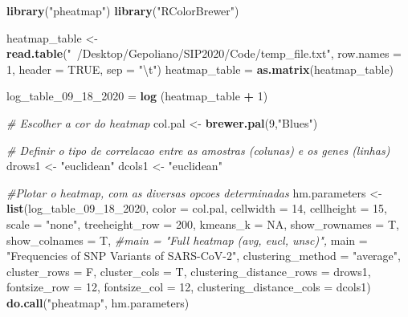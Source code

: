 \documentclass[
]{article}
\newenvironment{Shaded}{\begin{snugshade}}{\end{snugshade}}
\newcommand{\CharTok}[1]{\textcolor[rgb]{0.31,0.60,0.02}{#1}}
\newcommand{\CommentTok}[1]{\textcolor[rgb]{0.56,0.35,0.01}{\textit{#1}}}
\newcommand{\DataTypeTok}[1]{\textcolor[rgb]{0.13,0.29,0.53}{#1}}
\newcommand{\DecValTok}[1]{\textcolor[rgb]{0.00,0.00,0.81}{#1}}
\newcommand{\KeywordTok}[1]{\textcolor[rgb]{0.13,0.29,0.53}{\textbf{#1}}}
\newcommand{\NormalTok}[1]{#1}
\newcommand{\OperatorTok}[1]{\textcolor[rgb]{0.81,0.36,0.00}{\textbf{#1}}}
\newcommand{\OtherTok}[1]{\textcolor[rgb]{0.56,0.35,0.01}{#1}}
\newcommand{\StringTok}[1]{\textcolor[rgb]{0.31,0.60,0.02}{#1}}
\begin{document}
\begin{Shaded}
\begin{Highlighting}[]
\KeywordTok{library}\NormalTok{(}\StringTok{"pheatmap"}\NormalTok{)}
\KeywordTok{library}\NormalTok{(}\StringTok{"RColorBrewer"}\NormalTok{)}

\NormalTok{heatmap_table <-}\StringTok{ }\KeywordTok{read.table}\NormalTok{(}\StringTok{"~/Desktop/Gepoliano/SIP2020/Code/temp_file.txt"}\NormalTok{, }\DataTypeTok{row.names =} \DecValTok{1}\NormalTok{, }\DataTypeTok{header =} \OtherTok{TRUE}\NormalTok{, }\DataTypeTok{sep =} \StringTok{"}\CharTok{\textbackslash{}t}\StringTok{"}\NormalTok{)}
\NormalTok{heatmap_table =}\StringTok{ }\KeywordTok{as.matrix}\NormalTok{(heatmap_table)}

\NormalTok{log_table_}\DecValTok{09}\NormalTok{_}\DecValTok{18}\NormalTok{_}\DecValTok{2020}\NormalTok{ =}\StringTok{ }\KeywordTok{log}\NormalTok{ (heatmap_table }\OperatorTok{+}\StringTok{ }\DecValTok{1}\NormalTok{)}

\CommentTok{# Escolher a cor do heatmap}
\NormalTok{col.pal <-}\StringTok{ }\KeywordTok{brewer.pal}\NormalTok{(}\DecValTok{9}\NormalTok{,}\StringTok{"Blues"}\NormalTok{)}

\CommentTok{# Definir o tipo de correlacao entre as amostras (colunas) e os genes (linhas)}
\NormalTok{drows1 <-}\StringTok{ "euclidean"}
\NormalTok{dcols1 <-}\StringTok{ "euclidean"}

\CommentTok{#Plotar o heatmap, com as diversas opcoes determinadas}
\NormalTok{hm.parameters <-}\StringTok{ }\KeywordTok{list}\NormalTok{(log_table_}\DecValTok{09}\NormalTok{_}\DecValTok{18}\NormalTok{_}\DecValTok{2020}\NormalTok{, }
                      \DataTypeTok{color =}\NormalTok{ col.pal,}
                      \DataTypeTok{cellwidth =} \DecValTok{14}\NormalTok{, }\DataTypeTok{cellheight =} \DecValTok{15}\NormalTok{, }\DataTypeTok{scale =} \StringTok{"none"}\NormalTok{,}
                      \DataTypeTok{treeheight_row =} \DecValTok{200}\NormalTok{,}
                      \DataTypeTok{kmeans_k =} \OtherTok{NA}\NormalTok{,}
                      \DataTypeTok{show_rownames =}\NormalTok{ T, }\DataTypeTok{show_colnames =}\NormalTok{ T,}
                      \CommentTok{#main = "Full heatmap (avg, eucl, unsc)",}
                      \DataTypeTok{main =} \StringTok{"Frequencies of SNP Variants of SARS-CoV-2"}\NormalTok{,}
                      \DataTypeTok{clustering_method =} \StringTok{"average"}\NormalTok{,}
                      \DataTypeTok{cluster_rows =}\NormalTok{ F, }\DataTypeTok{cluster_cols =}\NormalTok{ T,}
                      \DataTypeTok{clustering_distance_rows =}\NormalTok{ drows1, }
                      \DataTypeTok{fontsize_row =} \DecValTok{12}\NormalTok{,}
                      \DataTypeTok{fontsize_col =} \DecValTok{12}\NormalTok{,}
                      \DataTypeTok{clustering_distance_cols =}\NormalTok{ dcols1)}
\KeywordTok{do.call}\NormalTok{(}\StringTok{"pheatmap"}\NormalTok{, hm.parameters)}
\end{Highlighting}
\end{Shaded}
\end{document}
